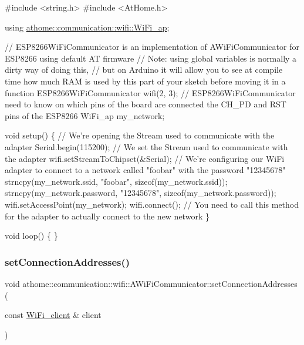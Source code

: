 \begin{DoxyCode}
\textcolor{preprocessor}{#include <string.h>}
\textcolor{preprocessor}{#include <AtHome.h>}

\textcolor{keyword}{using} \mbox{\hyperlink{structathome_1_1communication_1_1wifi_1_1s__wifi__access__point}{athome::communication::wifi::WiFi\_ap}};

\textcolor{comment}{// ESP8266WiFiCommunicator is an implementation of AWiFiCommunicator for ESP8266 using default AT firmware}
\textcolor{comment}{// Note: using global variables is normally a dirty way of doing this,}
\textcolor{comment}{// but on Arduino it will allow you to see at compile time how much RAM is used by this part of your sketch
       before moving it in a function}
ESP8266WiFiCommunicator wifi(2, 3); \textcolor{comment}{// ESP8266WiFiCommunicator need to know on which pins of the board are
       connected the CH\_PD and RST pins of the ESP8266}
WiFi\_ap my\_network;

\textcolor{keywordtype}{void} setup() \{
  \textcolor{comment}{// We're opening the Stream used to communicate with the adapter}
  Serial.begin(115200);
  \textcolor{comment}{// We set the Stream used to communicate with the adapter}
  wifi.setStreamToChipset(&Serial);
  \textcolor{comment}{// We're configuring our WiFi adapter to connect to a network called "foobar" with the password
       "12345678"}
  strncpy(my\_network.ssid, \textcolor{stringliteral}{"foobar"}, \textcolor{keyword}{sizeof}(my\_network.ssid));
  strncpy(my\_network.password, \textcolor{stringliteral}{"12345678"}, \textcolor{keyword}{sizeof}(my\_network.password));
  wifi.setAccessPoint(my\_network);
  wifi.connect(); \textcolor{comment}{// You need to call this method for the adapter to actually connect to the new network}
\}

\textcolor{keywordtype}{void} loop() \{
\}
\end{DoxyCode}
 \mbox{\label{classathome_1_1communication_1_1wifi_1_1_a_wi_fi_communicator_a31fb91672f298718d99bb9776dfe46c9}} 
\subsubsection{\texorpdfstring{set\+Connection\+Addresses()}{setConnectionAddresses()}}
{\footnotesize\ttfamily void athome\+::communication\+::wifi\+::\+A\+Wi\+Fi\+Communicator\+::set\+Connection\+Addresses (\begin{DoxyParamCaption}\item[{const \mbox{\hyperlink{structathome_1_1communication_1_1wifi_1_1s__wifi__client}{Wi\+Fi\+\_\+client}} \&}]{client }\end{DoxyParamCaption})}

